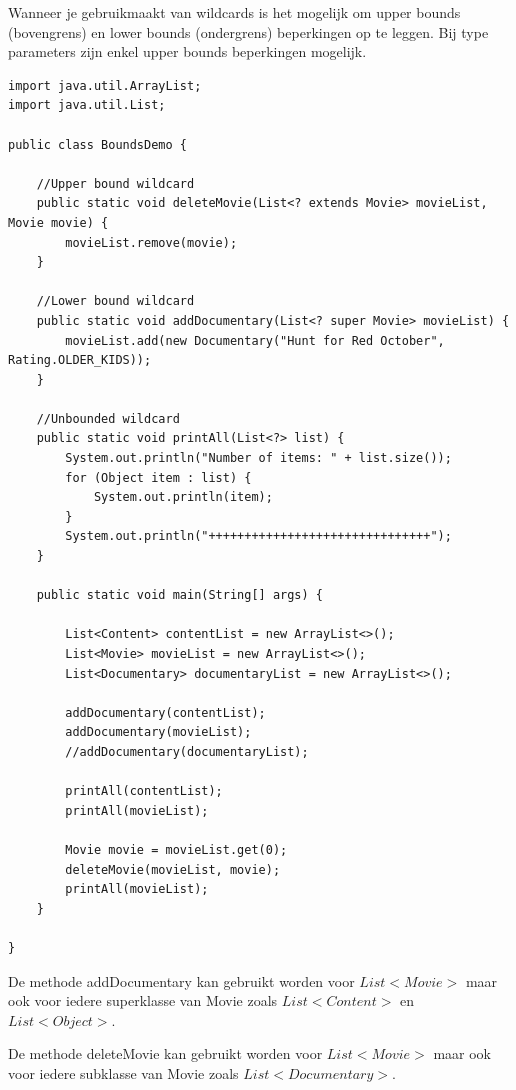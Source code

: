 Wanneer je gebruikmaakt van wildcards is het mogelijk om upper bounds (bovengrens) en lower bounds (ondergrens) beperkingen op te leggen. Bij type parameters zijn enkel upper bounds beperkingen mogelijk.

\begin{lstlisting}
import java.util.ArrayList;
import java.util.List;

public class BoundsDemo {

	//Upper bound wildcard
	public static void deleteMovie(List<? extends Movie> movieList, Movie movie) {
		movieList.remove(movie);
	}

	//Lower bound wildcard
	public static void addDocumentary(List<? super Movie> movieList) {
		movieList.add(new Documentary("Hunt for Red October", Rating.OLDER_KIDS));
	}

	//Unbounded wildcard
	public static void printAll(List<?> list) {
		System.out.println("Number of items: " + list.size());
		for (Object item : list) {
			System.out.println(item);
		}
		System.out.println("+++++++++++++++++++++++++++++++");
	}

	public static void main(String[] args) {

		List<Content> contentList = new ArrayList<>();
		List<Movie> movieList = new ArrayList<>();
		List<Documentary> documentaryList = new ArrayList<>();

		addDocumentary(contentList);
		addDocumentary(movieList);
		//addDocumentary(documentaryList);

		printAll(contentList);
		printAll(movieList);

		Movie movie = movieList.get(0);
		deleteMovie(movieList, movie);
		printAll(movieList);
	}

}
\end{lstlisting}

De methode addDocumentary kan gebruikt worden voor $List<Movie>$ maar ook voor iedere superklasse van Movie zoals $List<Content>$ en $List<Object>$.

De methode deleteMovie kan gebruikt worden voor $List<Movie>$ maar ook voor iedere subklasse van Movie zoals $List<Documentary>$.

